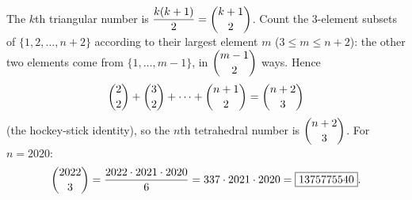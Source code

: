 The $k$th triangular number is $\dfrac{k(k+1)}2=\dbinom{k+1}2$. Count the $3$-element subsets of $\{1,2,\dots,n+2\}$ according to their largest element $m$ ($3\le m\le n+2$): the other two elements come from $\{1,\dots,m-1\}$, in $\dbinom{m-1}2$ ways. Hence
\[\dbinom{2}{2}+\dbinom32+\cdots+\dbinom{n+1}2=\dbinom{n+2}3\]
(the hockey-stick identity), so the $n$th tetrahedral number is $\dbinom{n+2}3$. For $n=2020$:
\[\dbinom{2022}{3}=\dfrac{2022\cdot2021\cdot2020}{6}=337\cdot2021\cdot2020=\boxed{1375775540}.\]
